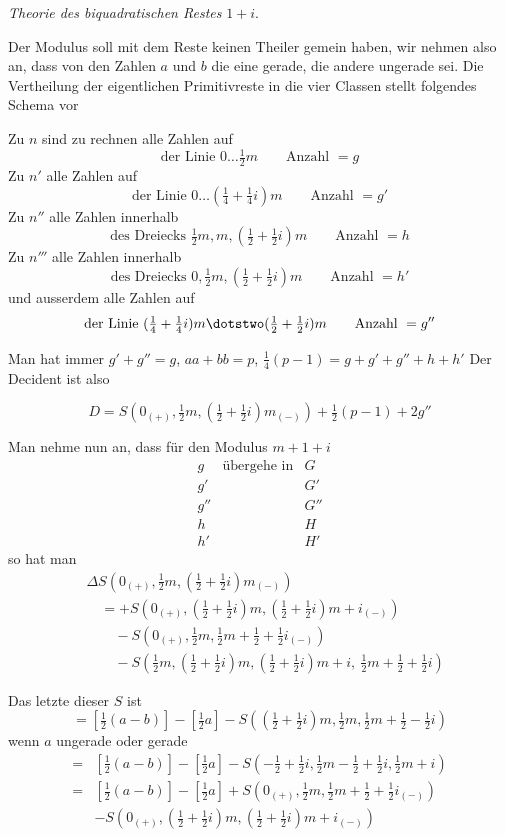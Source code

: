 \begin{center}\emph{Theorie des biquadratischen Restes} $1+i$.\end{center}
Der Modulus soll mit dem Reste keinen Theiler gemein haben, wir nehmen also an, dass von den Zahlen $a$ und $b$ die eine gerade, die andere ungerade sei. Die Vertheilung der eigentlichen Primitivreste in die vier Classen stellt folgendes Schema vor
\begin{center}\resizebox{.90\textwidth}{!}{}\end{center}

Zu $n$ sind zu rechnen alle Zahlen auf
\[
\text{der Linie }0\ldots\tfrac12m\qquad\text{Anzahl }=g
\]
Zu $n'$ alle Zahlen auf
\[
\text{der Linie }0\ldots(\tfrac14+\tfrac14i)m\qquad\text{Anzahl }=g'
\]
Zu $n''$ alle Zahlen innerhalb
\[
\text{des Dreiecks }\tfrac12m,m,(\tfrac12+\tfrac12i)m\qquad\text{Anzahl }=h
\]
Zu $n'''$ alle Zahlen innerhalb
\[
\text{des Dreiecks }0,\tfrac12m,(\tfrac12+\tfrac12i)m\qquad\text{Anzahl }=h'
\]
und ausserdem alle Zahlen auf
\[
\text{der Linie }(\tfrac14+\tfrac14i)m\dotstwo(\tfrac12+\tfrac12i)m\qquad\text{Anzahl }=g''
\]

Man hat immer $g'+g''=g$, $aa+bb=p$, $\frac14(p-1)=g+g'+g''+h+h'$ Der Decident ist also

\[
D=S(0_{(+)},\tfrac12m,(\tfrac12+\tfrac12i)m_{(-)})+\tfrac12(p-1)+2g''
\]

Man nehme nun an, dass für den Modulus $m+1+i$
\[
\begin{array}{clc}
g&\text{übergehe in}&G\\
g'&&G'\\
g''&&G''\\
h&&H\\
h'&&H'
\end{array}
\]
so hat man
\[
\begin{aligned}
&\Delta S(0_{(+)},\tfrac12m,(\tfrac12+\tfrac12i)m_{(-)})\\
&\quad=+S(0_{(+)},(\tfrac12+\tfrac12i)m,(\tfrac12+\tfrac12i)m+i_{(-)})\\
&\qquad-S(0_{(+)},\tfrac12m,\tfrac12m+\tfrac12+\tfrac12i_{(-)})\\
&\qquad-S(\tfrac12m,(\tfrac12+\tfrac12i)m,(\tfrac12+\tfrac12i)m+i,\ \tfrac12m+\tfrac12+\tfrac12i)
\end{aligned}
\]

Das letzte dieser $S$ ist
\[
=\left[\tfrac12(a-b)\right]-\left[\tfrac12a\right]-S((\tfrac12+\tfrac12i)m,\tfrac12m,\tfrac12m+\tfrac12-\tfrac12i)
\]
wenn $a$ ungerade oder gerade
\[
\begin{aligned}
={}&\left[\tfrac12(a-b)\right]-\left[\tfrac12a\right]-S(-\tfrac12+\tfrac12i,\tfrac12m-\tfrac12+\tfrac12i,\tfrac12m+i)\\
={}&\left[\tfrac12(a-b)\right]-\left[\tfrac12a\right]+S(0_{(+)},\tfrac12m,\tfrac12m+\tfrac12+\tfrac12i_{(-)})\\
&-S(0_{(+)},(\tfrac12+\tfrac12i)m,(\tfrac12+\tfrac12i)m+i_{(-)})
\end{aligned}
\]

